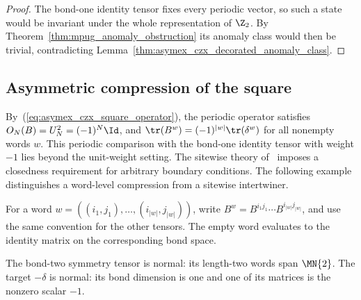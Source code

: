 \begin{proof}
    \leanok
    The bond-one identity tensor fixes every periodic vector, so such a
    state would be invariant under the whole representation of $\Z_2$.
    By Theorem~\ref{thm:mpug_anomaly_obstruction} its anomaly class would
    then be trivial, contradicting
    Lemma~\ref{thm:asymex_czx_decorated_anomaly_class}.
\end{proof}

\subsection{Asymmetric compression of the square}

By~(\ref{eq:asymex_czx_square_operator}), the periodic operator satisfies
$O_N(B)=U_N^2=(-1)^N\Id$, and $\tr(B^w)=(-1)^{|w|}\tr(\delta^w)$ for all
nonempty words $w$. This periodic comparison with the bond-one identity tensor with weight $-1$
lies beyond the unit-weight setting. The sitewise theory
of~\cite[Appendix~A]{GarreRubio2023MPOSym} imposes a closedness requirement for
arbitrary boundary conditions. The following example distinguishes a
word-level compression from a sitewise intertwiner.

For a word $w=((i_1,j_1),\ldots,(i_{|w|},j_{|w|}))$,
write $B^w=B^{i_1j_1}\cdots B^{i_{|w|}j_{|w|}}$, and use the
same convention for the other tensors. The empty word evaluates to
the identity matrix on the corresponding bond space.

\begin{lemma}
    \label{thm:asymex_czx_normal}
    \leanok
    The bond-two symmetry tensor is normal: its length-two words span
    $\MN{2}$. The target $-\delta$ is normal: its bond dimension is one and
    one of its matrices is the nonzero scalar $-1$.
\end{lemma}

